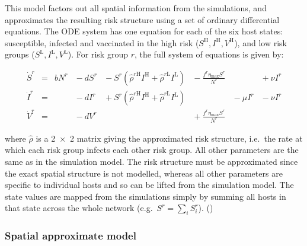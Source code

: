 This model factors out all spatial information from the simulations, and approximates the resulting risk structure using a set of ordinary differential equations. The ODE system has one equation for each of the six host states: susceptible, infected and vaccinated in the high risk ($S^\mathrm{H}, I^\mathrm{H}, V^\mathrm{H}$), and low risk groups ($S^\mathrm{L}, I^\mathrm{L}, V^\mathrm{L}$). For risk group $r$, the full system of equations is given by:
\begin{linenomath*}
\begin{equation}
\begin{alignedat}{7}
    \dot{S}^r &={} &bN^r &{}-{} dS^r &{}-{} S^r\left(\hat{\rho}^{r\mathrm{H}}I^{\mathrm{H}} + \hat{\rho}^{r\mathrm{L}}I^{\mathrm{L}}\right) &{}-{} \frac{f^r\eta{}_\mathrm{max}S^r}{N^r} &&{}+{} \nu{}I^r \\
    \dot{I}^r &={}  &&{}-{} dI^r &{}+{} S^r\left(\hat{\rho}^{r\mathrm{H}}I^{\mathrm{H}} + \hat{\rho}^{r\mathrm{L}}I^{\mathrm{L}}\right)& &{}-{} \mu{}I^r &{}-{} \nu{}I^r \\
    \dot{V}^r &={}  &&{}-{} dV^r &&{}+{} \frac{f^r\eta{}_\mathrm{max}S^r}{N^r}&&
\end{alignedat}
\label{eq:risk_model}
\end{equation}
\end{linenomath*}
where $\hat{\rho}$ is a \num{2x2} matrix giving the approximated risk structure, i.e.\ the rate at which each risk group infects each other risk group.  All other parameters are the same as in the simulation model. The risk structure must be approximated since the exact spatial structure is not modelled, whereas all other parameters are specific to individual hosts and so can be lifted from the simulation model. The state values are mapped from the simulations simply by summing all hosts in that state across the whole network (e.g.\ $S^r = \sum_{i}S^r_i$). ()

\subsubsection*{Spatial approximate model}

